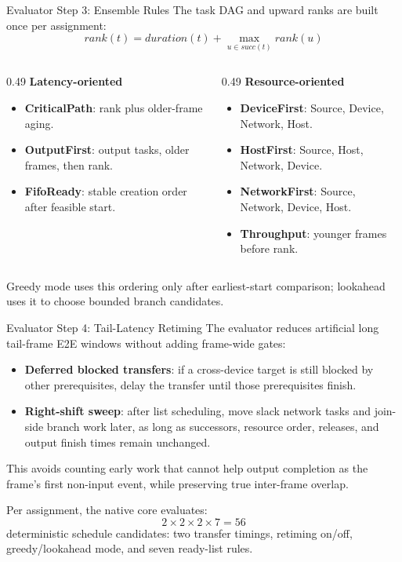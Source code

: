 \documentclass[aspectratio=169]{beamer}
\begin{document}
\begin{frame}{Evaluator Step 3: Ensemble Rules}
  \small
  The task DAG and upward ranks are built once per assignment:
  \[
    rank(t)=duration(t)+\max_{u \in succ(t)} rank(u)
  \]
  \begin{columns}[T,onlytextwidth]
    \begin{column}{0.49\textwidth}
      \textbf{Latency-oriented}
      \begin{itemize}
        \item \textbf{CriticalPath}: rank plus older-frame aging.
        \item \textbf{OutputFirst}: output tasks, older frames, then rank.
        \item \textbf{FifoReady}: stable creation order after feasible start.
      \end{itemize}
    \end{column}
    \begin{column}{0.49\textwidth}
      \textbf{Resource-oriented}
      \begin{itemize}
        \item \textbf{DeviceFirst}: Source, Device, Network, Host.
        \item \textbf{HostFirst}: Source, Host, Network, Device.
        \item \textbf{NetworkFirst}: Source, Network, Device, Host.
        \item \textbf{Throughput}: younger frames before rank.
      \end{itemize}
    \end{column}
  \end{columns}
  \vspace{0.4em}

  Greedy mode uses this ordering only after earliest-start comparison; lookahead
  uses it to choose bounded branch candidates.
\end{frame}

\begin{frame}{Evaluator Step 4: Tail-Latency Retiming}
  The evaluator reduces artificial long tail-frame E2E windows without adding frame-wide gates:
  \begin{itemize}
    \item \textbf{Deferred blocked transfers}: if a cross-device target is still blocked by other prerequisites, delay the transfer until those prerequisites finish.
    \item \textbf{Right-shift sweep}: after list scheduling, move slack network tasks and join-side branch work later, as long as successors, resource order, releases, and output finish times remain unchanged.
  \end{itemize}
  This avoids counting early work that cannot help output completion as the frame's first non-input event, while preserving true inter-frame overlap.
  \vspace{0.5em}

  Per assignment, the native core evaluates:
  \[
    2 \times 2 \times 2 \times 7 = 56
  \]
  deterministic schedule candidates: two transfer timings, retiming on/off, greedy/lookahead mode, and seven ready-list rules.
\end{frame}
\end{document}
